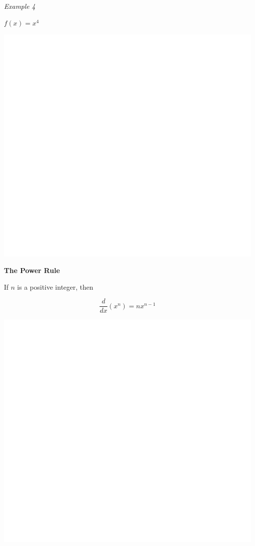 \documentclass[]{book}
\begin{document}
\newpage

\emph{Example 4}

\(f(x)=x^4\)

\begin{center}\includegraphics[width=1\linewidth]{figure/LB6-1} \end{center}

\textbf{The Power Rule}

If \(n\) is a positive integer, then

\[\frac{d}{dx}(x^n)=nx^{n-1}\]

\begin{center}\includegraphics[width=1\linewidth]{figure/LB7-1} \end{center}
\end{document}
